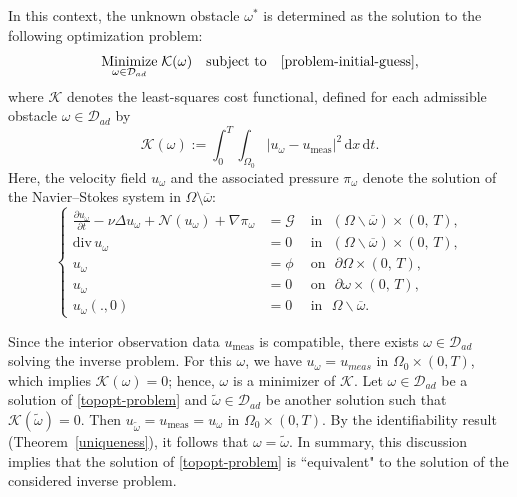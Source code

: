 \documentclass[a4paper,12pt,reqno,natbib]{amsart}
\def\N{\mathcal N}
\begin{document}
In this context, the unknown obstacle $\omega^*$ is determined as the solution to the following optimization problem:
\begin{equation}\label{topopt-problem}
\underset{\omega \in \mathcal{D}_{ad}}{\operatorname{Minimize}}\; \mathcal{K}(\omega)
\quad \text{subject to} \quad \eqref{problem-initial-guess},
\end{equation}
where $\mathcal{K}$ denotes the least-squares cost functional, defined for each admissible obstacle $\omega \in \mathcal{D}_{ad}$ by
\begin{equation}\label{L-S}
\mathcal{K}(\omega) := \int_0^T \int_{\Omega_0} 
\big| u_\omega - u_{\mathrm{meas}} \big|^2 \, \mathrm{d}x \, \mathrm{d}t.
\end{equation}
Here, the velocity field \(u_\omega\) and the associated pressure \(\pi_\omega\) denote 
the solution of the Navier–Stokes system in \(\Omega \setminus \overline{\omega}\):
\begin{equation}\label{problem-initial-guess}
\left\{
\begin{array}{rll}
\displaystyle \frac {\partial u_\omega}{\partial t}-\nu
\Delta u_\omega+ \N(u_\omega)+ \nabla \pi_\omega
 &= \mathcal{G} &\mbox{ in }  \,\,(\Omega\backslash\overline{\omega})\times (0,\,T) ,\\
\mbox{div}\, u_\omega &=  0 & \mbox{ in } \,\, (\Omega\backslash\overline{\omega}) \times (0,\,T) ,\\
u_\omega &= \phi & \mbox{ on }\,\,  \partial\Omega \times (0,\,T) , \\
u_\omega &=  0 & \mbox{ on } \,\, \partial\omega \times (0,\,T) ,\\
u_\omega(.,0)&= 0&\mbox{ in } \,\,  \Omega\backslash\overline{\omega}.
\end{array}
 \right.
\end{equation}

Since the interior observation data \(u_{\mathrm{meas}}\) is compatible, there exists 
\(\omega \in \mathcal{D}_{ad}\) solving the inverse problem. For this \(\omega\), we have 
\(u_\omega = u_{meas}\) in \(\Omega_0 \times (0,T)\), which implies \(\mathcal{K}(\omega) = 0\); 
hence, \(\omega\) is a minimizer of \(\mathcal{K}\). 
Let \(\omega \in \mathcal{D}_{ad}\) be a solution of \eqref{topopt-problem} and 
\(\widetilde{\omega} \in \mathcal{D}_{ad}\) be another solution such that 
\(\mathcal{K}(\widetilde{\omega}) = 0\). Then 
\(u_{\widetilde{\omega}} = u_{\mathrm{meas}} = u_{\omega}\) in 
\(\Omega_0 \times (0,T)\). By the identifiability result 
(Theorem~\ref{uniqueness}), it follows that \(\omega = \widetilde{\omega}\).  In summary, this discussion implies that the solution of \eqref{topopt-problem} is ``equivalent" to the solution of the considered inverse problem.
\end{document}
